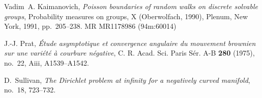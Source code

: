 \documentclass[12pt]{amsart}
\begin{document}
%
%
\providecommand{\bysame}{\leavevmode\hbox to3em{\hrulefill}\thinspace}
\providecommand{\MR}{\relax\ifhmode\unskip\space\fi MR }
\providecommand{\MRhref}[2]{%
  \href{http://www.ams.org/mathscinet-getitem?mr=#1}{#2}
} 
\providecommand{\href}[2]{#2}
\begin{thebibliography}{Rob02}
Vadim~A. Kaimanovich, \emph{Poisson boundaries of random walks on discrete
  solvable groups}, Probability measures on groups, X (Oberwolfach, 1990),
  Plenum, New York, 1991, pp.~205--238. \MR{MR1178986 (94m:60014)}

J.-J. Prat, \emph{\'{E}tude asymptotique et convergence angulaire du mouvement
  brownien sur une vari\'et\'e \`a courbure n\'egative}, C. R. Acad. Sci. Paris
  S\'er. A-B \textbf{280} (1975), no.~22, Aiii, A1539--A1542.

D.~Sullivan, \emph{The {D}irichlet problem at infinity for a negatively curved
  manifold}, no.~18, 723--732.

\end{thebibliography}
\end{document}

